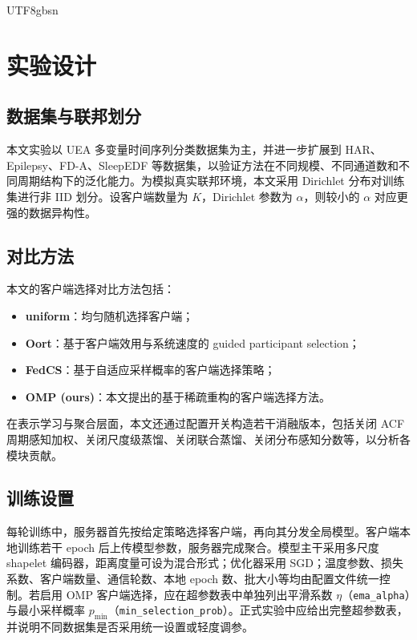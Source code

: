 \documentclass{article}
\begin{document}
\begin{CJK*}{UTF8}{gbsn}
\section{实验设计}

\subsection{数据集与联邦划分}

本文实验以 UEA 多变量时间序列分类数据集为主，并进一步扩展到 HAR、Epilepsy、FD-A、SleepEDF 等数据集，以验证方法在不同规模、不同通道数和不同周期结构下的泛化能力。为模拟真实联邦环境，本文采用 Dirichlet 分布对训练集进行非 IID 划分。设客户端数量为 $K$，Dirichlet 参数为 $\alpha$，则较小的 $\alpha$ 对应更强的数据异构性。

\subsection{对比方法}

本文的客户端选择对比方法包括：
\begin{itemize}[leftmargin=2em]
    \item \textbf{uniform}：均匀随机选择客户端；
    \item \textbf{Oort}：基于客户端效用与系统速度的 guided participant selection；
    \item \textbf{FedCS}：基于自适应采样概率的客户端选择策略；
    \item \textbf{OMP (ours)}：本文提出的基于稀疏重构的客户端选择方法。
\end{itemize}

在表示学习与聚合层面，本文还通过配置开关构造若干消融版本，包括关闭 ACF 周期感知加权、关闭尺度级蒸馏、关闭联合蒸馏、关闭分布感知分数等，以分析各模块贡献。

\subsection{训练设置}

每轮训练中，服务器首先按给定策略选择客户端，再向其分发全局模型。客户端本地训练若干 epoch 后上传模型参数，服务器完成聚合。模型主干采用多尺度 shapelet 编码器，距离度量可设为混合形式；优化器采用 SGD；温度参数、损失系数、客户端数量、通信轮数、本地 epoch 数、批大小等均由配置文件统一控制。若启用 OMP 客户端选择，应在超参数表中单独列出平滑系数 $\eta$（\texttt{ema\_alpha}）与最小采样概率 $p_{\min}$（\texttt{min\_selection\_prob}）。正式实验中应给出完整超参数表，并说明不同数据集是否采用统一设置或轻度调参。


\end{CJK*}
\end{document}
